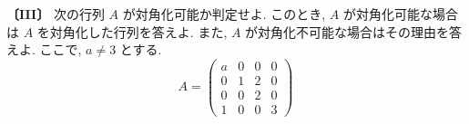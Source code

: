 \noindent\textbf{〔III〕}
次の行列 $A$ が対角化可能か判定せよ. このとき, $A$ が対角化可能な場合は $A$ を対角化した行列を答えよ.
また, $A$ が対角化不可能な場合はその理由を答えよ. ここで, $a\ne 3$ とする.
\[
A=\begin{pmatrix}
a & 0 & 0 & 0\\
0 & 1 & 2 & 0\\
0 & 0 & 2 & 0\\
1 & 0 & 0 & 3
\end{pmatrix}
\]
